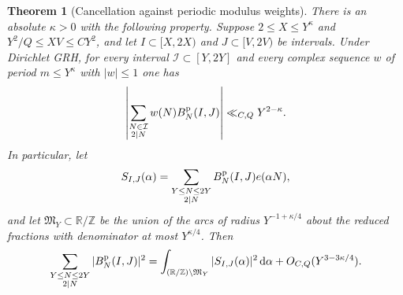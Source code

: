 \documentclass[11pt,a4paper]{article}
\numberwithin{equation}{section}
\newtheorem{theorem}{Theorem}[section]
\newcommand{\ud}{\mathrm d}
\begin{document}
\begin{theorem}[Cancellation against periodic modulus weights]
\label{thm:criticalgridperiodicmoduli}
There is an absolute $\kappa>0$ with the following property.
Suppose $2\le X\le Y^\kappa$ and $Y^2/Q\le XV\le CY^2$,
and let $I\subset[X,2X)$ and $J\subset[V,2V)$ be intervals.
Under Dirichlet GRH, for every interval $\mathcal I\subset[Y,2Y]$
and every complex sequence $w$ of period $m\le Y^\kappa$ with
$|w|\le1$ one has
\begin{equation}
 \left|
   \sum_{\substack{N\in\mathcal I\\2\mid N}}
            w(N) B_N^{\rm p}(I,J)
 \right|\ll_{C,Q} Y^{2-\kappa}.
 \label{eq:criticalgridperiodicmoduli}
\end{equation}
In particular, let
\[
 S_{I,J}(\alpha)=\sum_{\substack{Y\le N\le 2Y\\2\mid N}}
                      B_N^{\rm p}(I,J)e(\alpha N),
\]
and let $\mathfrak M_Y\subset\mathbb R/\mathbb Z$ be the union
of the arcs of radius $Y^{-1+\kappa/4}$ about the reduced
fractions with denominator at most $Y^{\kappa/4}$.
Then
\begin{equation}
 \sum_{\substack{Y\le N\le 2Y\\2\mid N}} |B_N^{\rm p}(I,J)|^2
   =\int_{(\mathbb R/\mathbb Z)\setminus\mathfrak M_Y}
        |S_{I,J}(\alpha)|^2\,\ud\alpha
      +O_{C,Q}(Y^{3-3\kappa/4}).
 \label{eq:criticalgridmodulusarcs}
\end{equation}
\end{theorem}
\end{document}

